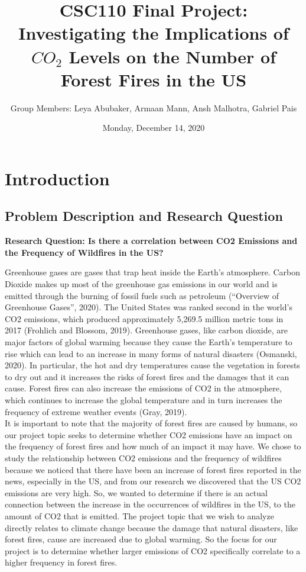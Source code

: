 \documentclass[fontsize=11pt]{article}
\title{CSC110 Final Project: \\ Investigating the Implications of $CO_2$ Levels on the Number of Forest Fires in the US}
\author{Group Members: Leya Abubaker, Armaan  Mann, Ansh Malhotra, Gabriel Pais}
\date{Monday, December 14, 2020}
\begin{document}
\maketitle
\section{Introduction}
\subsection{Problem Description and Research Question}

\textbf{Research Question:
Is there a correlation between CO2 Emissions and the Frequency of Wildfires in the US?}


Greenhouse gases are gases that trap heat inside the Earth's atmosphere. Carbon Dioxide makes up most of the greenhouse gas emissions in our world and is emitted through the burning of fossil fuels such as petroleum (“Overview of Greenhouse Gases”, 2020). The United States was ranked second in the world's CO2 emissions, which produced approximately 5,269.5 million metric tons in 2017 (Frohlich and Blossom, 2019). Greenhouse gases, like carbon dioxide, are major factors of global warming because they cause the Earth’s temperature to rise which can lead to an increase in many forms of natural disasters (Osmanski, 2020).  In particular, the hot and dry temperatures cause the vegetation in forests to dry out and it increases the risks of forest fires and the damages that it can cause. Forest fires can also increase the emissions of CO2 in the atmosphere, which continues to increase the global temperature and in turn increases the frequency of extreme weather events (Gray, 2019). \\
\newline
It is important to note that the majority of forest fires are caused by humans, so our project topic seeks to determine whether CO2 emissions have an impact on the frequency of forest fires and how much of an impact it may have. We chose to study the relationship between CO2 emissions and the frequency of wildfires because we noticed that there have been an increase of forest fires reported in the news, especially in the US, and from our research we discovered that the US CO2 emissions are very high. So, we wanted to determine if there is an actual connection between the increase in the occurrences of wildfires in the US, to the amount of CO2 that is emitted. The project topic that we wish to analyze directly relates to climate change because the damage that natural disasters, like forest fires, cause are increased due to global warming. So the focus for our project is to determine whether larger emissions of CO2 specifically correlate to a higher frequency in forest fires. 
\newline 
\end{document}
